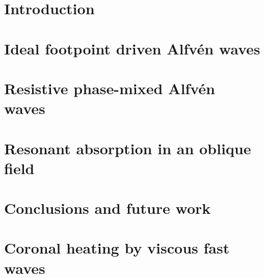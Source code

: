 \documentclass[12pt,fleqn]{report}
\numberwithin{equation}{section}
\begin{document}

 
\tableofcontents

\chapter{Introduction}
\label{chap:introduction}


\chapter{Ideal footpoint driven Alfv\'en waves}
\label{chap:ideal_footpoint_driven_alfven_waves}


\chapter{Resistive phase-mixed Alfv\'en waves}
\label{chap:resistive_phase_mixed_alfven_waves}

 
\chapter{Resonant absorption in an oblique field}
\label{chap:resonant_absorption_in_an_oblique_field}

 
\chapter{Conclusions and future work}
\label{chap:conclusions_and_future_work}


\appendix
\chapter{Coronal heating by viscous fast waves}
\label{adx:coronal_heating_by_viscous_fast_waves}




\end{document}

